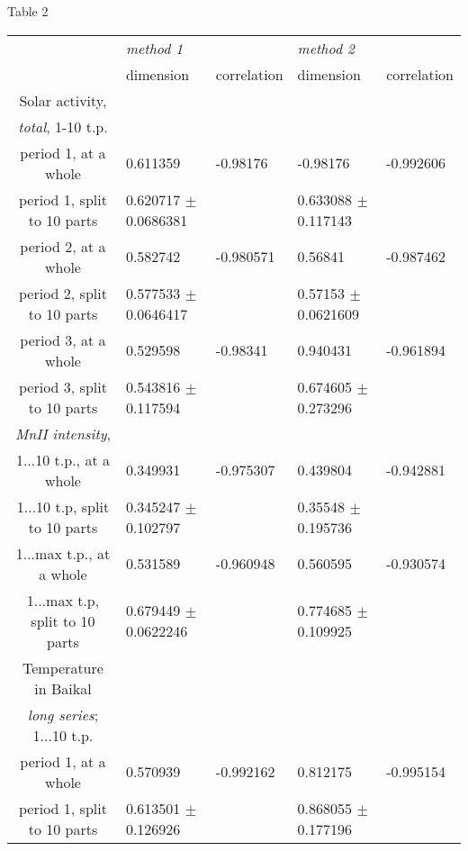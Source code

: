 \documentclass[a4paper]{article}
\begin{document}
Table 2 \textit{}

\small{

\begin{tabular}{cllll}
\hline
                               & \textit{method 1}        &             & \textit{method 2}        &             \\
                               & dimension                & correlation & dimension                & correlation \\
\hline 
Solar activity,\\
\textit{total}, 1-10 t.p.\\
period 1, at a whole           & 0.611359                 & -0.98176    & -0.98176                 & -0.992606   \\
period 1, split to 10 parts    & 0.620717 $\pm$ 0.0686381 &             & 0.633088 $\pm$ 0.117143  &             \\
period 2, at a whole           & 0.582742                 & -0.980571   & 0.56841                  & -0.987462   \\
period 2, split to 10 parts    & 0.577533 $\pm$ 0.0646417 &             & 0.57153  $\pm$ 0.0621609 &             \\
period 3, at a whole           & 0.529598                 & -0.98341    & 0.940431                 & -0.961894   \\
period 3, split to 10 parts    & 0.543816 $\pm$ 0.117594  &             & 0.674605 $\pm$ 0.273296  &             \\
\textit{MnII intensity},\\
1...10 t.p., at a whole        & 0.349931                 & -0.975307   & 0.439804                 & -0.942881   \\
1...10 t.p, split to 10 parts  & 0.345247 $\pm$ 0.102797  &             & 0.35548 $\pm$ 0.195736   &             \\
1...max t.p., at a whole       & 0.531589                 & -0.960948   & 0.560595                 & -0.930574   \\
1...max t.p, split to 10 parts & 0.679449 $\pm$ 0.0622246 &             & 0.774685 $\pm$ 0.109925  &             \\
\hline
Temperature in Baikal\\
\textit{long series}; 1...10 t.p.\\
period 1, at a whole           & 0.570939                 & -0.992162   & 0.812175                 & -0.995154   \\
period 1, split to 10 parts    & 0.613501 $\pm$ 0.126926  &             & 0.868055 $\pm$ 0.177196  &             \\

\end{tabular}}
\end{document}

